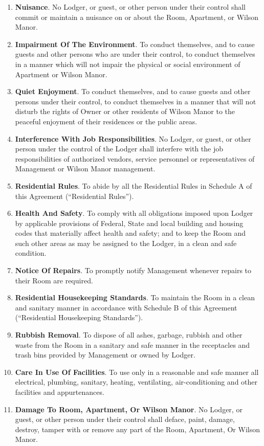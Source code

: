 \documentclass[12pt,letterpaper]{article}
\newcommand{\lodger}{Lodger}
\newcommand{\rules}{Residential Rules}
\newcommand{\standards}{Residential Housekeeping Standards}
\newcommand{\management}{Management}
\newcommand{\condo}{Wilson Manor}
\newcommand{\apt}{Apartment}
\newcommand{\room}{Room}
\begin{document}
\begin{enumerate}
		\begin{enumerate}
			\item \textbf{Nuisance}. No \lodger{}, or guest, or other person under their control shall commit or maintain a nuisance on or about the \room{}, \apt{}, or \condo{}. 
			\item \textbf{Impairment Of The Environment}. To conduct themselves, and to cause guests and other persons who are under their control, to conduct themselves in a manner which will not impair the physical or social environment of \apt{} or \condo{}. 
			\item \textbf{Quiet Enjoyment}. To conduct themselves, and to cause guests and other persons under their control, to conduct themselves in a manner that will not disturb the rights of Owner or other residents of \condo{} to the peaceful enjoyment of their residences or the public areas. 
			\item \textbf{Interference With Job Responsibilities}. No \lodger{}, or guest, or other person under the control of the \lodger{} shall interfere with the job responsibilities of authorized vendors, service personnel or representatives of \management{} or \condo{} management. 
			\item \textbf{\rules{}}. To abide by all the \rules{} in Schedule A of this Agreement (``\rules{}'').
			\item \textbf{Health And Safety}. To comply with all obligations imposed upon \lodger{} by applicable provisions of Federal, State and local building and housing codes that materially affect health and safety; and to keep the \room{} and such other areas as may be assigned to the \lodger{}, in a clean and safe condition. 
			\item \textbf{Notice Of Repairs}. To promptly notify \management{} whenever repairs to their \room{} are required. 
			\item \textbf{\standards{}}. To maintain the \room{} in a clean and sanitary manner in accordance with Schedule B of this Agreement (``\standards{}'').
			\item \textbf{Rubbish Removal}. To dispose of all ashes, garbage, rubbish and other waste from the \room{} in a sanitary and safe manner in the receptacles and trash bins provided by \management{} or owned by \lodger{}. 
			\item \textbf{Care In Use Of Facilities}. To use only in a reasonable and safe manner all electrical, plumbing, sanitary, heating, ventilating, air-conditioning and other facilities and appurtenances. 
			\item \textbf{Damage To \room{}, \apt{}, Or \condo{}}. No \lodger{}, or guest, or other person under their control shall deface, paint, damage, destroy, tamper with or remove any part of the \room{}, \apt{}, Or \condo{}.

\end{enumerate}
\end{enumerate}
\end{document}
